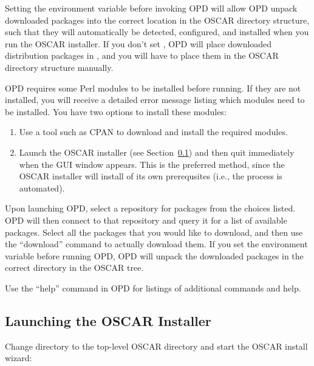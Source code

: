 Setting the  environment variable before invoking
OPD will allow OPD unpack downloaded packages into the correct
location in the OSCAR directory structure, such that they will
automatically be detected, configured, and installed when you run the
OSCAR installer.  If you don't set , OPD will place
downloaded distribution packages in , and
you will have to place them in the OSCAR directory structure manually.

OPD requires some Perl modules to be installed before running.  If
they are not installed, you will receive a detailed error message
listing which modules need to be installed.  You have two options to
install these modules:

\begin{enumerate}
\item Use a tool such as CPAN to download and install the required
  modules.
  
\item Launch the OSCAR installer (see
  Section~\ref{det:installcluster}) and then quit immediately when the
  GUI window appears.  This is the preferred method, since the OSCAR
  installer will install of its own prerequsites (i.e., the process is
  automated).
\end{enumerate}

Upon launching OPD, select a repository for packages from the choices
listed.  OPD will then connect to that repository and query it for a
list of available packages.  Select all the packages that you would
like to download, and then use the ``download'' command to actually
download them.  If you set the  environment
variable before running OPD, OPD will unpack the downloaded packages
in the correct directory in the OSCAR tree.

Use the ``help'' command in OPD for listings of additional commands
and help.

  
\subsection{Launching the OSCAR Installer}
\label{det:installcluster}

Change directory to the top-level OSCAR directory and start the OSCAR
install wizard:

